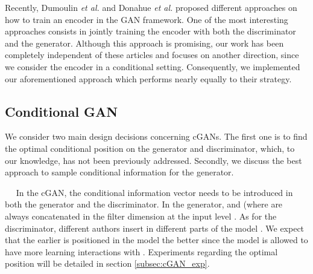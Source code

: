 \documentclass{article}
\newcommand{\minisection}[1]{\vspace{0.04in} \noindent {\bf #1}\ \ }
\begin{document}
Recently, Dumoulin \textit{et al.} \citep{Dumoulin2016} and Donahue \textit{et al.} \citep{Donahue2016} proposed different approaches on how to train an encoder in the GAN framework. One of the most interesting approaches consists in jointly training the encoder with both the discriminator and the generator.
Although this approach is promising, our work has been completely independent of these articles and  focuses on another direction, since we consider the encoder in a conditional setting. Consequently, we implemented our aforementioned approach which performs nearly equally \citep{Donahue2016} to their strategy.

\subsection{Conditional GAN} \label{icgan:cgan}
We consider two main design decisions concerning cGANs. The first one is to find the optimal conditional position  on the generator and discriminator, which, to our knowledge, has not been previously addressed. Secondly, we discuss the best approach to sample conditional information for the generator.

\minisection{Conditional position}
In the cGAN, the conditional information vector  needs to be introduced in both the generator and the discriminator. In the generator,  and  (where  are always concatenated in the filter dimension at the input level \citep{Reed2016,Mirza2014,Gauthier2014}. As for the discriminator, different authors insert  in different parts of the model \citep{Reed2016,Mirza2014,Gauthier2014}. We expect that the earlier  is positioned in the model the better since the model is allowed to have more learning interactions with . Experiments regarding the optimal  position will be detailed in section \ref{subsec:cGAN_exp}.
\end{document}
